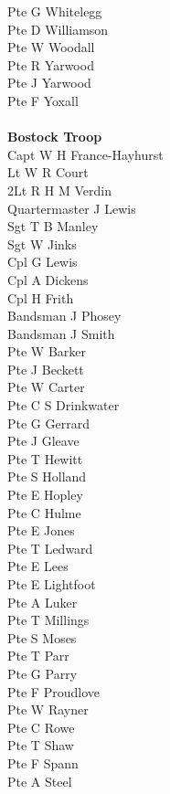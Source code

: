 \begin{multicols}{2}
  Pte G Whitelegg \\
  Pte D Williamson \\
  Pte W Woodall \\
  Pte R Yarwood \\
  Pte J Yarwood \\
  Pte F Yoxall \\
  \\
  \textbf{Bostock Troop} \\
  Capt W H France-Hayhurst \\
  Lt W R Court \\
  2Lt R H M Verdin \\
  Quartermaster J Lewis \\
  Sgt T B Manley \\
  Sgt W Jinks \\
  Cpl G Lewis \\
  Cpl A Dickens \\
  Cpl H Frith \\
  Bandsman J Phosey \\
  Bandsman J Smith \\
  Pte W Barker \\
  Pte J Beckett \\
  Pte W Carter \\
  Pte C S Drinkwater \\
  Pte G Gerrard \\
  Pte J Gleave \\
  Pte T Hewitt \\
  Pte S Holland \\
  Pte E Hopley \\
  Pte C Hulme \\
  Pte E Jones \\
  Pte T Ledward \\
  Pte E Lees \\
  Pte E Lightfoot \\
  Pte A Luker \\
  Pte T Millings \\
  Pte S Moses \\
  Pte T Parr \\
  Pte G Parry \\
  Pte F Proudlove \\
  Pte W Rayner \\
  Pte C Rowe \\
  Pte T Shaw \\
  Pte F Spann \\
  Pte A Steel \\
  \\

\end{multicols}
